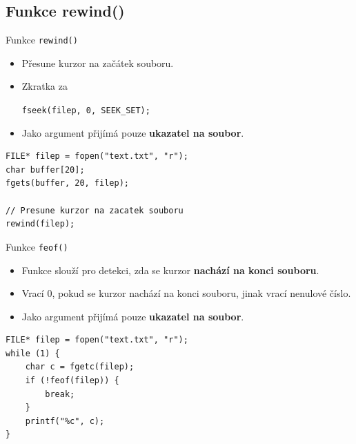 \documentclass[14pt,aspectratio=169]{beamer}
\begin{document}
    \subsection{Funkce rewind()}
    \begin{frame}[t,fragile]{Funkce \texttt{rewind()}}
        \begin{itemize}
            \item Přesune kurzor na začátek souboru.
            \item Zkratka za
            \begin{center}
                \texttt{fseek(filep, 0, SEEK\_SET);}
            \end{center}
            \item Jako argument přijímá pouze \textbf{ukazatel na soubor}.
        \end{itemize}
        \begin{lstlisting}
FILE* filep = fopen("text.txt", "r");
char buffer[20];
fgets(buffer, 20, filep);

// Presune kurzor na zacatek souboru
rewind(filep);
        \end{lstlisting}
    \end{frame}

    \begin{frame}[t,fragile]{Funkce \texttt{feof()}}
        \begin{itemize}
            \item Funkce slouží pro detekci, zda se kurzor \textbf{nachází na konci souboru}.
            \item Vrací $0$, pokud se kurzor nachází na konci souboru, jinak vrací nenulové číslo.
            \item Jako argument přijímá pouze \textbf{ukazatel na soubor}.
        \end{itemize}
        \begin{lstlisting}
FILE* filep = fopen("text.txt", "r");
while (1) {
    char c = fgetc(filep);
    if (!feof(filep)) {
        break;
    }
    printf("%c", c);
}
        \end{lstlisting}
    \end{frame}
\end{document}
